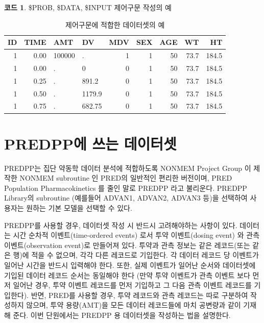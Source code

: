 \documentclass[
  10pt,
  krantz2,
  a4paper]{krantz}
\newenvironment{Shaded}{\begin{snugshade}}{\end{snugshade}}
\newcommand{\ErrorTok}[1]{\textcolor[rgb]{0.64,0.00,0.00}{\textbf{#1}}}
\newcommand{\NormalTok}[1]{#1}
\newcommand{\OperatorTok}[1]{\textcolor[rgb]{0.81,0.36,0.00}{\textbf{#1}}}
\newenvironment{Shaded}{\begin{snugshade}}{\end{snugshade}}
\theoremstyle{definition}
\theoremstyle{definition}
\newtheorem{example}{코드}[chapter]
\theoremstyle{definition}
\theoremstyle{remark}
\begin{document}
\begin{example}
\protect\hypertarget{exm:input}{}{\label{exm:input} }\$PROB, \$DATA, \$INPUT 제어구문 작성의 예
\end{example}

\begin{Shaded}
\end{Shaded}

\begin{table}

\caption{\label{tab:tab}제어구문에 적합한 데이터셋의 예}
\centering
\begin{tabular}[t]{rrllrrrrr}
\toprule
ID & TIME & AMT & DV & MDV & SEX & AGE & WT & HT\\
\midrule
1 & 0.00 & 100000 & . & 1 & 1 & 50 & 73.7 & 184.5\\
1 & 0.00 & . & 0 & 0 & 1 & 50 & 73.7 & 184.5\\
1 & 0.25 & . & 891.2 & 0 & 1 & 50 & 73.7 & 184.5\\
1 & 0.50 & . & 1179.9 & 0 & 1 & 50 & 73.7 & 184.5\\
1 & 0.75 & . & 682.75 & 0 & 1 & 50 & 73.7 & 184.5\\
\bottomrule
\end{tabular}
\end{table}

\hypertarget{predppuxc5d0-uxc4f0uxb294-uxb370uxc774uxd130uxc14b}{%
\section{PREDPP에 쓰는 데이터셋}\label{predppuxc5d0-uxc4f0uxb294-uxb370uxc774uxd130uxc14b}}

PREDPP는 집단 약동학 데이터 분석에 적합하도록 NONMEM Project Group 이 제작한 NONMEM subroutine 인 PRED의 일반적인 편리한 버전이며, PRED Population Pharmacokinetics 를 줄인 말로 PREDPP 라고 불리운다. PREDPP Library의 subroutine (예를들어 ADVAN1, ADVAN2, ADVAN3 등)을 선택하여 사용자는 원하는 기본 모델을 선택할 수 있다.

PREDPP를 사용할 경우, 데이터셋 작성 시 반드시 고려해야하는 사항이 있다. 데이터는 시간 순차적 이벤트(time-ordered events) 로서 투약 이벤트(dosing event) 와 관측 이벤트(observation event)로 만들어져 있다. 투약과 관측 정보는 같은 레코드(또는 같은 행)에 적을 수 없으며, 각각 다른 레코드로 기입한다. 각 데이터 레코드 당 이벤트가 일어난 시간을 반드시 입력해야 한다. 또한, 실제 이벤트가 일어난 순서와 데이터셋에 기입된 데이터 레코드 순서는 동일해야 한다 (만약 투약 이벤트가 관측 이벤트 보다 먼저 일어난 경우, 투약 이벤트 레코드를 먼저 기입하고 그 다음 관측 이벤트 레코드를 기입한다). 반면, PRED를 사용할 경우, 투약 레코드와 관측 레코드는 따로 구분하여 작성하지 않으며, 투약 용량(AMT)을 모든 데이터 레코드들에 마치 공변량과 같이 기재해 준다. 이번 단원에서는 PREDPP 용 데이터셋을 작성하는 법을 설명한다.
\end{document}
